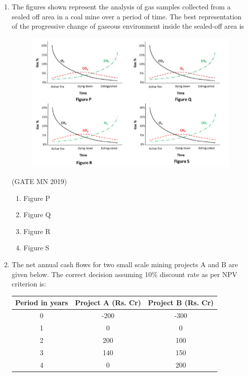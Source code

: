 \documentclass[journal]{IEEEtran}
\begin{document}
\begin{enumerate}
\item The figures shown represent the analysis of gas samples collected from a sealed off area in a coal mine over a period of time. The best representation of the progressive change of gaseous environment inside the sealed-off area is
\begin{figure}[H]
    \centering
        \includegraphics[width=1\textwidth]{Screenshot_2025_0818_150943.png}
	    \caption{}
    \label{fig:Q42}
    \end{figure}

    \hfill(GATE MN 2019)
\begin{multicols}{2}
\begin{enumerate}
\item Figure P
\item Figure Q
\item Figure R
\item Figure S
\end{enumerate}
\end{multicols}

\item The net annual cash flows for two small scale mining projects A and B are given below. The correct decision assuming 10\% discount rate as per NPV criterion is:


  \begin{table}[H]
    \centering\normalsize
\begin{tabular}{|c|c|c|}
\hline
Period in years & Project A (Rs. Cr) & Project B (Rs. Cr) \\
\hline
0 & -200 & -300 \\\hline
1 & 0 & 0 \\\hline
2 & 200 & 100 \\\hline
3 & 140 & 150 \\\hline
4 & 0 & 200 \\
\hline
\end{tabular}



\end{table}
\end{enumerate}
\end{document}
